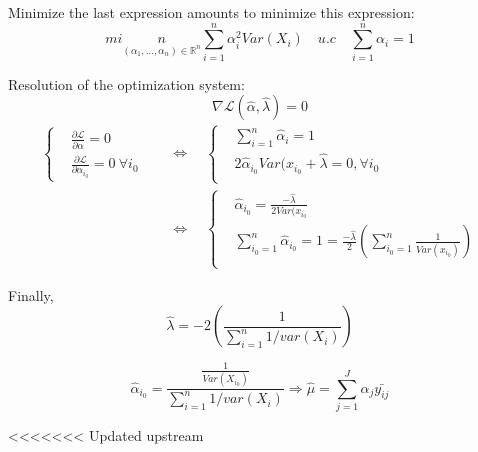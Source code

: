 \documentclass[unknownkeysallowed]{beamer}
\begin{document}
\begin{frame}
Minimize the last expression amounts to minimize this expression: 
    $$ min\limits_{(\alpha_{1},...,\alpha_{n})\in \mathbb{R}^{n}} \sum\limits_{i=1}^{n}\alpha_{i}^{2}Var(X_{i}) \quad u.c \quad  \sum\limits_{i=1}^{n}\alpha_{i}=1 $$
\begin{itemize}\setlength{\itemsep}{5pt}
\end{itemize}
Resolution of the optimization system:
\[\nabla \mathcal{L}(\hat\alpha,\hat\lambda)=0\]
\[
\begin{aligned}
\begin{cases}
&  \frac{\partial \mathcal{L}}{\partial \alpha}=0 \\
&  \frac{\partial \mathcal{L}}{\partial \alpha_{i_0}}=0\ \forall i_0 
\end{cases}
\quad&\Longleftrightarrow\quad
\begin{cases}
&  \sum\limits_{i=1}^{n}\hat{\alpha}_i=1 \\
&  2\hat\alpha_{i_0}Var(x_{i_0} + \hat\lambda =0, \forall{i_0}  \\
\end{cases}\\
& \Longleftrightarrow\quad
\begin{cases}
&  \hat\alpha_{i_0}=\frac{-\hat\lambda}{2Var(x_{i_0}} \\
& \sum\limits_{i_{0}=1}^{n}\hat{\alpha}_i_{0}=1=\frac{-\hat\lambda}{2}(\sum_{i_{0}=1}^{n}\frac{1}{Var(x_{i_0})}) \\

\end{cases}
\end{aligned}
\]
\end{frame}
\begin{frame}
    Finally, $$ \hat \lambda = -2(\frac{1}{\sum_{i=1}^{n}1/var(X_{i})})$$
    
     $$\hat\alpha_{i_0}=\frac{\frac{1}{Var(X_i_0)}}{\sum_{i=1}^{n}1/var(X_{i})} 
    \Longrightarrow \hat\mu = \sum_{j=1}^{J}\alpha_{j}\bar{y_{ij}}$$
\end{frame}
<<<<<<< Updated upstream
\end{document}
